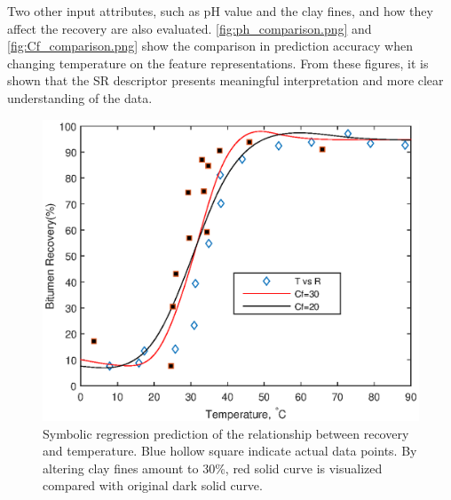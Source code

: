 \documentclass[10pt,journal,compsoc]{IEEEtran}
\begin{document}
Two other input attributes, such as pH value and the clay fines, and how they affect the recovery are also evaluated. \autoref{fig:ph_comparison.png} and \autoref{fig:Cf_comparison.png} show the comparison in prediction accuracy when changing temperature on the feature representations. From these figures, it is shown that the SR descriptor presents meaningful interpretation and more clear understanding of the data.



  \begin{figure}[tb]
       \centering
       \includegraphics[width=\linewidth,clip]{T_comparison.eps}
       \vspace{-2em}
                \caption{Symbolic regression prediction of the relationship between recovery and temperature. Blue hollow square indicate actual data points. By altering clay fines amount to 30\%, red solid curve is visualized compared with original dark solid curve.}
       \label{fig:t_comparison.png}
  \end{figure}
\end{document}
